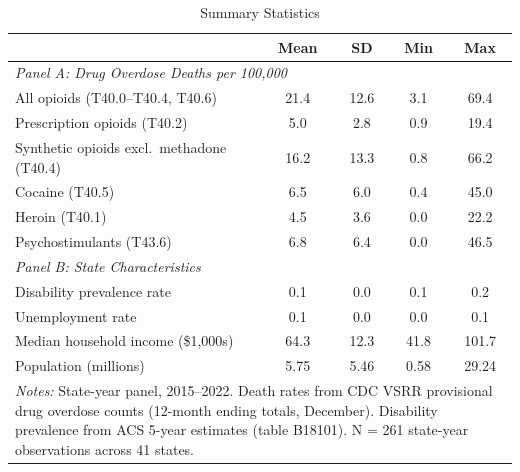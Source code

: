\begin{table}[htbp]
\centering
\caption{Summary Statistics}
\label{tab:summary}
\begin{tabular}{lcccc}
\hline\hline
& Mean & SD & Min & Max \\
\hline
\multicolumn{5}{l}{\textit{Panel A: Drug Overdose Deaths per 100,000}} \\[3pt]
All opioids (T40.0--T40.4, T40.6) & 21.4 & 12.6 & 3.1 & 69.4 \\
Prescription opioids (T40.2) & 5.0 & 2.8 & 0.9 & 19.4 \\
Synthetic opioids excl.\ methadone (T40.4) & 16.2 & 13.3 & 0.8 & 66.2 \\
Cocaine (T40.5) & 6.5 & 6.0 & 0.4 & 45.0 \\
Heroin (T40.1) & 4.5 & 3.6 & 0.0 & 22.2 \\
Psychostimulants (T43.6) & 6.8 & 6.4 & 0.0 & 46.5 \\
[6pt]
\multicolumn{5}{l}{\textit{Panel B: State Characteristics}} \\[3pt]
Disability prevalence rate & 0.1 & 0.0 & 0.1 & 0.2 \\
Unemployment rate & 0.1 & 0.0 & 0.0 & 0.1 \\
Median household income (\$1,000s) & 64.3 & 12.3 & 41.8 & 101.7 \\
Population (millions) & 5.75 & 5.46 & 0.58 & 29.24 \\
\hline\hline
\multicolumn{5}{p{12cm}}{\footnotesize \textit{Notes:} State-year panel, 2015--2022. Death rates from CDC VSRR provisional drug overdose counts (12-month ending totals, December). Disability prevalence from ACS 5-year estimates (table B18101). N = 261 state-year observations across 41 states.} \\
\end{tabular}
\end{table}
